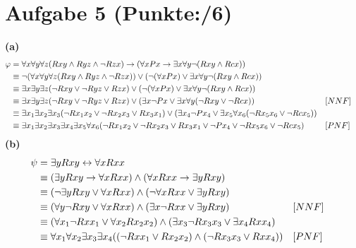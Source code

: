 \documentclass[11pt, a4paper]{article}
\newcommand{\pppp}{6}
\begin{document}
\section*{Aufgabe 5 (Punkte:\qquad/\pppp)}
\textbf{(a)}
	\begin{align*}
	\varphi &= \forall x \forall y \forall z(Rxy \wedge Ryz \wedge \neg Rzx) \rightarrow (\forall xPx \rightarrow \exists x \forall y\neg(Rxy \wedge Rcx)) \\
		&\equiv \neg(\forall x \forall y \forall z(Rxy \wedge Ryz \wedge \neg Rzx)) \vee (\neg(\forall xPx) \vee \exists x \forall y\neg(Rxy \wedge Rcx)) \\
		&\equiv \exists x \exists y \exists z(\neg Rxy \vee \neg Ryz \vee Rzx) \vee (\neg(\forall xPx) \vee \exists x \forall y\neg(Rxy \wedge Rcx)) \\
		&\equiv \exists x \exists y \exists z(\neg Rxy \vee \neg Ryz \vee Rzx) \vee (\exists x\neg Px \vee \exists x \forall y(\neg Rxy \vee \neg Rcx)) \hfill &&[NNF]\\
		&\equiv \exists x_1 \exists x_2 \exists x_3(\neg Rx_1x_2 \vee \neg Rx_2x_3 \vee Rx_3x_1) \vee (\exists x_4\neg Px_4 \vee \exists x_5 \forall x_6(\neg Rx_5x_6 \vee \neg Rcx_5)) \\
		&\equiv \exists x_1 \exists x_2 \exists x_3 \exists x_4 \exists x_5 \forall x_6(\neg Rx_1x_2 \vee \neg Rx_2x_3 \vee Rx_3x_1 \vee \neg Px_4 \vee \neg Rx_5x_6 \vee \neg Rcx_5) \hfill &&[PNF]
	\end{align*}
\textbf{(b)}
	\begin{align*}
	\psi &= \exists yRxy \leftrightarrow \forall xRxx  \\
		&\equiv (\exists yRxy \rightarrow \forall xRxx) \wedge (\forall xRxx \rightarrow \exists yRxy)\\
		&\equiv (\neg\exists yRxy \vee \forall xRxx) \wedge (\neg\forall xRxx \vee \exists yRxy)\\
		&\equiv (\forall y\neg Rxy \vee \forall xRxx) \wedge (\exists x\neg Rxx \vee \exists yRxy) \hfill &&[NNF]\\
		&\equiv (\forall x_1\neg Rxx_1 \vee \forall x_2Rx_2x_2) \wedge (\exists x_3\neg Rx_3x_3 \vee \exists x_4Rxx_4) \\
		&\equiv \forall x_1 \forall x_2 \exists x_3 \exists x_4((\neg Rxx_1 \vee Rx_2x_2) \wedge (\neg Rx_3x_3 \vee Rxx_4)) \hfill &&[PNF]
	\end{align*}
\end{document}

